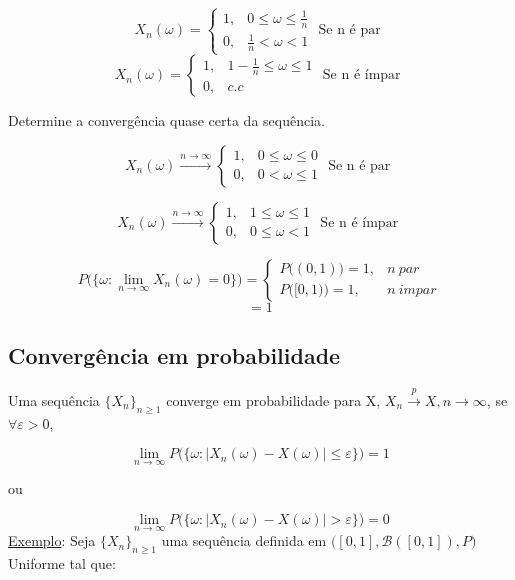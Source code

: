 \documentclass[a4paper,12pt]{article}
\begin{document}
$$X_n(\omega) = \begin{cases}
1, & 0\le \omega \le \frac{1}{n}\\
0,& \frac{1}{n}<\omega <1 
\end{cases} \text{\ \ \ \ \ Se n é par }$$ 
$$X_n(\omega) = \begin{cases}
1, & 1-\frac{1}{n}\le \omega \le 1\\
0,& c.c
\end{cases} \text{\ \ \ \ \ Se n é ímpar }$$ 

Determine a convergência quase certa da sequência.

$$X_n(\omega)\overset{n\rightarrow \infty}{\longrightarrow}  \begin{cases}
1, & 0\le \omega \le 0\\
0,&0<\omega \le 1 
\end{cases} \text{\ \ \ \ \ Se n é par }$$ 

$$X_n(\omega) \overset{n\rightarrow \infty}{\longrightarrow}  \begin{cases}
1, & 1\le \omega \le 1\\
0,& 0 \le \omega < 1
\end{cases} \text{\ \ \ \ \ Se n é ímpar }$$ 

$$ P\bigg(
\{
\omega : \lim\limits_{n\rightarrow \infty} X_n(\omega)=0
\}
\bigg)=\begin{cases}
P\bigg(
(0,1)
\bigg)= 1, & n \ par\\
P\bigg(
[0,1)
\bigg)=1, & n \ impar
\end{cases} $$
$$
=1
$$

\newpage 

\subsection{Convergência em probabilidade }

Uma sequência $\{X_n\}_{ n \ge 1}$ converge em probabilidade para X, $X_n\overset{p}{\longrightarrow}X, n\rightarrow \infty$,
 se $\forall \varepsilon >0$,
 

$$\lim\limits_{n\rightarrow \infty} P\bigg(
\{\omega: \bigg|
X_n(\omega) - X(\omega)
\bigg| \le \varepsilon\}
\bigg) = 1$$
\begin{center} ou \end{center}
$$\lim\limits_{n\rightarrow \infty} P\bigg(
\{\omega: \bigg|
X_n(\omega) - X(\omega)
\bigg| > \varepsilon\}
\bigg) = 0$$
\underline{Exemplo}:
Seja $\{X_n\}_{ n \ge 1}$ uma sequência definida em $\bigg([0,1],\mathscr B([0,1]),P\bigg)$ Uniforme tal que:
\end{document}
